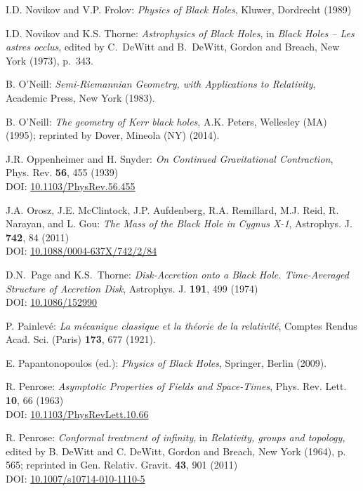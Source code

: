 \begin{thebibliography}{123}
I.D. Novikov and V.P. Frolov: {\em Physics of Black Holes},
Kluwer, Dordrecht (1989)

I.D. Novikov and K.S. Thorne: {\em Astrophysics of Black Holes},
in {\em Black Holes -- Les astres occlus},  edited by C.~DeWitt and B.~DeWitt,
Gordon and Breach, New York (1973), p.~343.

B. O'Neill: {\em Semi-Riemannian Geometry, with Applications to Relativity},
Academic Press, New York (1983).

B. O'Neill: {\em The geometry of Kerr black holes}, A.K. Peters, Wellesley (MA) (1995);
reprinted by Dover, Mineola (NY) (2014).

J.R. Oppenheimer and H. Snyder:
{\em On Continued Gravitational Contraction},
Phys. Rev. {\bf 56}, 455 (1939)\\
DOI: \href{https://doi.org/10.1103/PhysRev.56.455}{10.1103/PhysRev.56.455}

J.A. Orosz, J.E. McClintock, J.P. Aufdenberg, R.A. Remillard, M.J. Reid, R. Narayan, and L. Gou:
{\em The Mass of the Black Hole in Cygnus X-1},
Astrophys. J. {\bf 742}, 84 (2011)\\
DOI: \href{https://doi.org/10.1088/0004-637X/742/2/84}{10.1088/0004-637X/742/2/84}

D.N.~Page and K.S.~Thorne: \emph{Disk-Accretion onto a Black Hole. Time-Averaged Structure of Accretion Disk},
Astrophys. J. {\bf 191}, 499 (1974)\\
DOI: \href{https://doi.org/10.1086/152990}{10.1086/152990}

P. Painlevé: \emph{La mécanique classique et la théorie de la relativité},
Comptes Rendus Acad. Sci. (Paris) {\bf 173}, 677 (1921).

E. Papantonopoulos (ed.): {\em Physics of Black Holes}, Springer, Berlin (2009).

R. Penrose: {\em Asymptotic Properties of Fields and Space-Times},
Phys. Rev. Lett. {\bf 10}, 66 (1963)\\
DOI: \href{https://doi.org/10.1103/PhysRevLett.10.66}{10.1103/PhysRevLett.10.66}

R. Penrose: {\em Conformal treatment of infinity}, in {\em Relativity, groups and topology},
edited by B. DeWitt and C. DeWitt,
Gordon and Breach, New York (1964), p. 565; reprinted in
Gen. Relativ. Gravit. {\bf 43}, 901 (2011)\\
DOI: \href{https://doi.org/10.1007/s10714-010-1110-5}{10.1007/s10714-010-1110-5}


\end{thebibliography}
